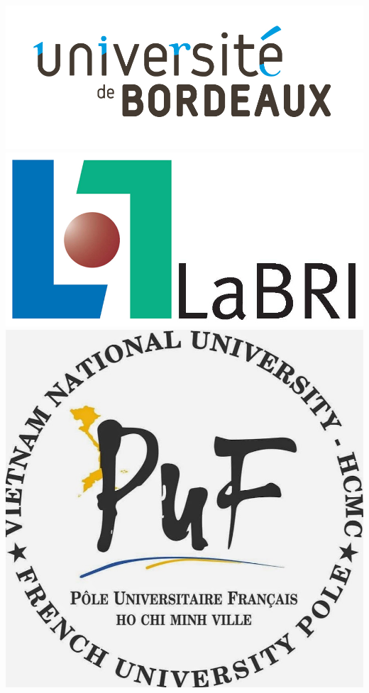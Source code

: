\begin{titlepage}
\begin{center}
\includegraphics[scale = 0.1]{./images/logo_bordeaux.jpg}  
\includegraphics[scale = 0.1]{./images/logo-LaBRI.jpg}  
\includegraphics[scale = 0.1]{./images/logo_PUF.jpg}~\\[1cm]

\end{center}
\end{titlepage}
